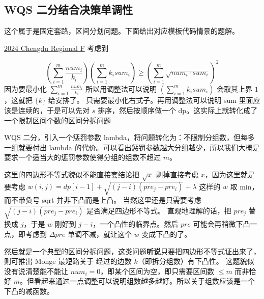 \subsection{WQS 二分结合决策单调性}

这个属于是固定套路，区间分划问题。下面给出对应模板代码情景的题解。

\href{https://codeforces.com/gym/105486/problem/F}{2024 Chengdu Regional F} 考虑到

$$
(\sum\limits_{i=1}^{m}\frac{num_i}{k_i}) (\sum\limits_{i=1}^{m}k_i sum_i) \ge (\sum_{i=1}^{m}\sqrt{num_i\cdot sum_i})^2
$$
因为要最小化 $\sum\limits_{i=1}^{m}\frac{num_i}{k_i}$ 所以用调整法可以说明 $(\sum\limits_{i=1}^{m}k_i sum_i)$ 会取其上界 $1$，这就把 $\{k\}$ 给安排了。
只需要最小化右式子。再用调整法可以说明 sum 里面应该是连续的，于是可以先对 $s$ 排序，然后按顺序做一个 dp。这实际上就转化成了一个限制区间个数的区间分拆问题

WQS 二分，引入一个惩罚参数 lambda，将问题转化为：不限制分组数，但每多一组就要付出 lambda 的代价。可以看出惩罚参数越大分组越少，所以我们大概是要求一个适当大的惩罚参数使得分组的组数不超过 $m$。

这里的四边形不等式貌似不能直接套结论把 $\sqrt{x}$ 剥掉直接考虑 $x$，因为这里就是要考虑 $w(i,j) = dp[i-1] + \sqrt{(j-i)(pre_{j} - pre_{i})} + \lambda$ 这样的 $w$ 取 min，而不带负号 sqrt 并非下凸而是上凸。
当然这里还是只需要考虑 $\sqrt{(j-i)(pre_{j} - pre_{i})}$ 是否满足四边形不等式。
直观地理解的话，把 $pre_j$ 替换成 $j$，于是 $w$ 刚好到 $j-i$，一个凸性的临界点。然后 $pre$ 可能会再稍微下凸一点，即考虑到 $\Delta pre$ 单调不减，就让这个 $w$ 变成下凸的了。

然后就是一个典型的区间分拆问题，这类问题\textbf{听说}只要把四边形不等式证出来了，则可推出 Monge 最短路关于 经过的边数 $k$（即拆分组数）有下凸性。
这题貌似没有说清楚能不能让 $num_i=0$，即某个区间为空，即只需要区间数 $\le m$ 而非恰好 $m$。但看起来通过一点调整可以说明组数越多越好。所以关于组数应该是一个下凸的减函数。

